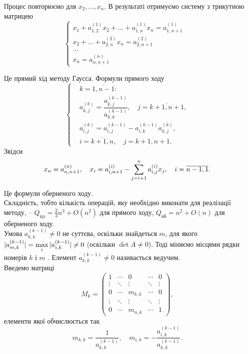 Процес повторюємо для $x_2, \ldots, x_n$. В результаті отримуємо систему з трикутною матрицею
\begin{equation}
	\label{eq:3.3}
	\left\{
		\begin{aligned}
		x_1 + a_{1,2}^{(1)} x_2 + \ldots + a_{1,n}^{(1)} x_n = a_{1,n+1}^{(1)}& \\
		x_2 + \ldots + a_{2,n}^{(2)} x_n = a_{2,n+1}^{(2)}& \\
		\ldots & \\
		x_n = a_{n,n+1}^{(n)} &
	\end{aligned}
	\right.
\end{equation}

Це прямий хід методу Гаусса. Формули прямого ходу
\[
	\left\{
		\begin{aligned}
			& k = \overline{1, n-1}: \\
			& a_{k,j}^{(k)} = \dfrac{a_{k,j}^{(k-1)}}{a_{k,k}^{(k-1)}}, \quad j =\overline{k+1,n+1}, \\
			& a_{i,j}^{(k)} = a_{i,j}^{(k-1)} - a_{i,k}^{(k-1)} a_{k,j}^{(k)}, \\
			& i = \overline{k+1, n}, \quad j = \overline{k +1, n + 1}.
		\end{aligned}
	\right.
\]
Звідси
\begin{equation}
	\label{eq:3.4}
	x_n = a_{n,n+1}^{(n)}, \quad x_i = a_{i,n+1}^{(i)} - \displaystyle\sum\limits_{j=i+1}^n a_{i,j}^{(i)} x_j, \quad i = \overline{n-1,1}.
\end{equation}

Це формули оберненого ходу. \\

Складність, тобто кількість операцій, яку необхідно виконати для реалізації методу, -- $Q_{\text{np}} = \frac23 n^3 + O(n^2)$ для прямого ходу, $Q_{\text{об}} = n^2 + O(n)$ для оберненого ходу. \\

Умова $a_{k,k}^{(k-1)} \ne 0$ не суттєва, оскільки знайдеться $m$, для якого $|a_{m,k}^{(k-1)}| = \displaystyle\max\limits_i |a_{i,k}^{(k-1)}| \ne 0$ (оскільки $\det A \ne 0$). Тоді міняємо місцями рядки номерів $k$ і $m$ . Елемент $a_{k,k}^{(k-1)} \ne 0$ називається ведучим. \\

Введемо матриці \[ M_k = \begin{pmatrix} 1 & \cdots & 0 & \cdots & 0 \\ \vdots & \ddots & \vdots & \ddots & \vdots \\ 0 & \cdots & m_{k,k} & \cdots & 0 \\ \vdots & \ddots & \vdots & \ddots & \vdots \\ 0 & \cdots & m_{n,k} & \cdots & 1 \end{pmatrix},\]
елементи якої обчислюється так 
\[ m_{k,k} = \dfrac{1}{a_{k,k}^{(k-1)}}, \quad m_{i,k}=-\dfrac{a_{i,k}^{(k-1)}}{a_{k,k}^{(k-1)}}. \]

